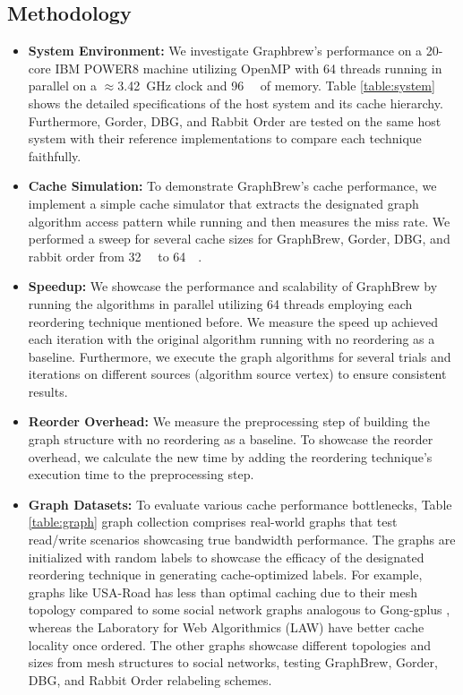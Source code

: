 \documentclass[sigconf, nonacm]{acmart}
\begin{document}
\subsection{Methodology}
\begin{itemize}[topsep=2pt,itemsep=2pt,wide]

    \item \textbf{System Environment:} We investigate Graphbrew's performance on a 20-core IBM POWER8 machine utilizing OpenMP with 64 threads running in parallel on a $\approx$\SI{3.42}{\giga\hertz} clock and \SI{96}{\giga\byte} of memory. Table \ref{table:system} shows the detailed specifications of the host system and its cache hierarchy. Furthermore, Gorder, DBG, and Rabbit Order are tested on the same host system with their reference implementations to compare each technique faithfully.
	
	\item \textbf{Cache Simulation:} To demonstrate GraphBrew's cache performance, we implement a simple cache simulator that extracts the designated graph algorithm access pattern while running and then measures the miss rate. We performed a sweep for several cache sizes for GraphBrew, Gorder, DBG, and rabbit order from \SI{32}{\kilo\byte} to \SI{64}{\mega\byte}.
	
	\item \textbf{Speedup:} We showcase the performance and scalability of GraphBrew by running the algorithms in parallel utilizing 64 threads employing each reordering technique mentioned before. We measure the speed up achieved each iteration with the original algorithm running with no reordering as a baseline. Furthermore, we execute the graph algorithms for several trials and iterations on different sources (algorithm source vertex) to ensure consistent results.
	
	\item \textbf{Reorder Overhead:} We measure the preprocessing step of building the graph structure with no reordering as a baseline. To showcase the reorder overhead, we calculate the new time by adding the reordering technique's execution time to the preprocessing step. 
    
	\item \textbf{Graph Datasets:} To evaluate various cache performance bottlenecks, Table \ref{table:graph} graph collection comprises real-world graphs that test read/write scenarios showcasing true bandwidth performance. The graphs are initialized with random labels to showcase the efficacy of the designated reordering technique in generating cache-optimized labels. For example, graphs like USA-Road \cite{noauthor_9th_nodate,beamer_gap_2017} has less than optimal caching due to their mesh topology compared to some social network graphs analogous to Gong-gplus \cite{gong_joint_2014,gong_reciprocal_2014,gong_evolution_2012,lakhotia_recall_2017}, whereas the Laboratory for Web Algorithmics (LAW) \cite{boldi_webgraph_2003} have better cache locality once ordered. The other graphs showcase different topologies and sizes from mesh structures to social networks, testing GraphBrew, Gorder, DBG, and Rabbit Order relabeling schemes.

\end{itemize}
\end{document}
